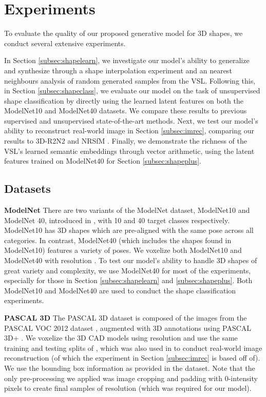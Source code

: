 \documentclass[10pt,twocolumn,letterpaper]{article}
\begin{document}
\section{Experiments}
\label{sec:3dshape}
To evaluate the quality of our proposed generative model for 3D shapes, we conduct several extensive experiments.

In Section \ref{subsec:shapelearn}, we investigate our model's ability to generalize and synthesize through a shape interpolation experiment and an nearest neighbours analysis of random generated samples from the VSL. Following this, in Section \ref{subsec:shapeclass}, we evaluate our model on the task of unsupervised shape classification by directly using the learned latent features on both the ModelNet10 and ModelNet40 datasets. We compare these results to previous supervised and unsupervised state-of-the-art methods. Next, we test our model's ability to reconstruct real-world image in Section \ref{subsec:imrec}, comparing our results to 3D-R2N2 \cite{choy20163d} and NRSfM \cite{kar2015category}. Finally, we demonstrate the richness of the VSL's learned semantic embeddings through vector arithmetic, using the latent features trained on ModelNet40 for Section \ref{subsec:shapeplus}.

\subsection{Datasets}
\label{subsec:datasets}
{\bf ModelNet} There are two variants of the ModelNet dataset, ModelNet10 and ModelNet 40, introduced in \cite{wu20153d}, with 10 and 40 target classes respectively. ModelNet10 has 3D shapes which are pre-aligned with the same pose across all categories. In contrast, ModelNet40 (which includes the shapes found in ModelNet10) features a variety of poses. We voxelize both ModelNet10 and ModelNet40 with resolution . To test our model's ability to handle 3D shapes of great variety and complexity, we use ModelNet40 for most of the experiments, especially for those in Section \ref{subsec:shapelearn} and \ref{subsec:shapeplus}. Both ModelNet10 and ModelNet40 are used to conduct the shape classification experiments.

{\bf PASCAL 3D} The PASCAL 3D dataset is composed of the images from the PASCAL VOC 2012 dataset \cite{everingham2015pascal}, augmented with 3D annotations using PASCAL 3D+ \cite{xiang_wacv14}. We voxelize the 3D CAD models using resolution  and use the same training and testing splits of \cite{kar2015category}, which was also used in \cite{choy20163d} to conduct real-world image reconstruction (of which the experiment in Section \ref{subsec:imrec} is based off of). We use the bounding box information as provided in the dataset. Note that the only pre-processing we applied was image cropping and padding with 0-intensity pixels to create final samples of resolution  (which was required for our model).
\end{document}
